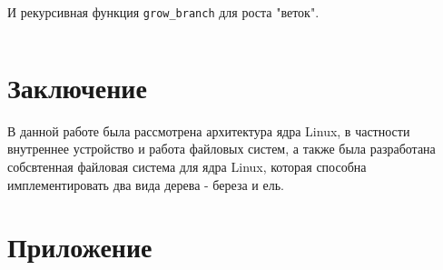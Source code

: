 \documentclass{article}
\begin{document}
    И рекурсивная функция \texttt{grow\_branch} для роста "веток".
    \begin{lstlisting}
    \end{lstlisting}

    \newpage
    \section{Заключение}
    В данной работе была рассмотрена архитектура ядра Linux, в частности
    внутреннее устройство и работа файловых систем, а также была разработана
    собсвтенная файловая система для ядра Linux, которая способна имплементировать
    два вида дерева - береза и ель.

    \newpage

    \begin{thebibliography}{99}
    \end{thebibliography}

    \newpage

    \section{Приложение}
\end{document}
